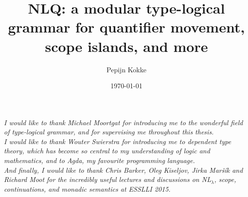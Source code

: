 \documentclass[a4paper]{article}
\title{NLQ: a modular type-logical grammar for quantifier movement,
  scope islands, and more}
\author{Pepijn Kokke}
\date{\today}
\begin{document}
\clearpage

\vspace*{\fill}
\begin{center}\itshape
  \noindent
  I would like to thank Michael Moortgat for introducing me to the
  wonderful field of type-logical grammar, and for supervising me
  throughout this thesis.
  \\[1\baselineskip]

  \noindent
  I would like to thank Wouter Swierstra for introducing me to
  dependent type theory, which has become so central to my
  understanding of logic and mathematics, and to Agda, my favourite
  programming language.
  \\[1\baselineskip]

  \noindent
  And finally, I would like to thank Chris Barker, Oleg Kiseljov,
  Jirka Maršík and Richard Moot for the incredibly useful lectures and
  discussions on NL$_{\lambda}$, scope, continuations, and monadic
  semantics at ESSLLI 2015.
  \\[1\baselineskip]
\end{center}
\vspace*{\fill}
\tableofcontents
\clearpage








%

\renewcommand\thesection{A}

\renewcommand\thesection{B}

\end{document}
